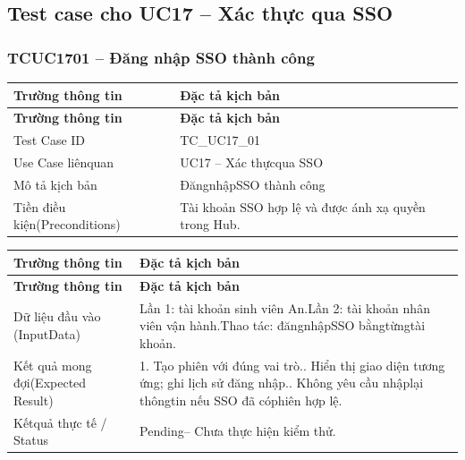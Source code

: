 \subsection{Test case cho UC17 – Xác thực qua SSO}
\subsubsection{TCUC1701 – Đăng nhập SSO thành công}
\begin{longtable}{|L{0.24\textwidth}|L{0.70\textwidth}|}
\hline
\textbf{Trường thông tin} & \textbf{Đặc tả kịch bản} \\
\hline
\endfirsthead
\hline
\textbf{Trường thông tin} & \textbf{Đặc tả kịch bản} \\
\hline
\endhead
Test Case ID & TC\_UC17\_01 \\
\hline
Use Case liênquan & UC17 – Xác thựcqua SSO \\
\hline
Mô tả kịch bản & ĐăngnhậpSSO thành công \\
\hline
Tiền điều kiện\newline (Preconditions) & Tài khoản SSO hợp lệ và được ánh xạ quyền trong Hub. \\
\hline
\end{longtable}
\vspace{-0.5\baselineskip}
\begin{longtable}{|L{0.24\textwidth}|L{0.70\textwidth}|}
\hline
\textbf{Trường thông tin} & \textbf{Đặc tả kịch bản} \\
\hline
\endfirsthead
\hline
\textbf{Trường thông tin} & \textbf{Đặc tả kịch bản} \\
\hline
\endhead
Dữ liệu đầu vào (Input\newline Data) & Lần 1: tài khoản sinh viên An.\newline Lần 2: tài khoản nhân viên vận hành.\newline Thao tác: đăngnhậpSSO bằngtừngtài khoản. \\
\hline
Kết quả mong đợi\newline (Expected Result) & 1. Tạo phiên với đúng vai trò.. Hiển thị giao diện tương ứng; ghi lịch sử đăng nhập.. Không yêu cầu nhậplại thôngtin nếu SSO đã cóphiên hợp lệ. \\
\hline
Kếtquả thực tế / Status & Pending– Chưa thực hiện kiểm thử. \\
\hline
\end{longtable}
\vspace{-0.5\baselineskip}
